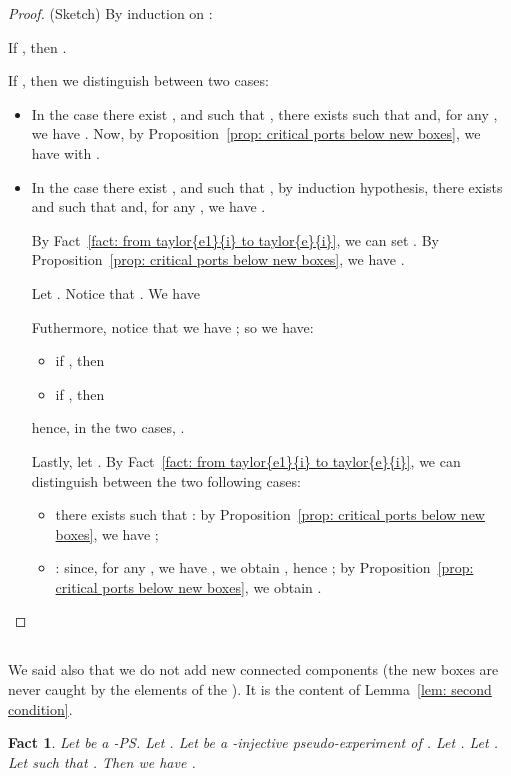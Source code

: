 \documentclass{article}
\theoremstyle{plain}
\newtheorem{fact}[theorem]{Fact}
\begin{document}
\begin{proof}
(Sketch) 
By induction on :

If , then .

If , then we distinguish between two cases:
\begin{itemize}
\item In the case there exist ,  and  such that , 
there exists  such that  and, for any , we have . 
Now, by Proposition~\ref{prop: critical ports below new boxes}, we have  with .
\item In the case there exist ,  and  such that , by induction hypothesis, there exists  and  such that  and, for any , we have . 

By Fact~\ref{fact: from taylor{e1}{i} to taylor{e}{i}}, we can set . By 
Proposition~\ref{prop: critical ports below new boxes}, we have .


Let . Notice that . We have 

Futhermore, notice that
we have ; so we have:
\begin{itemize}
\item if , then 

\item if , then

\end{itemize}
hence, in the two cases, .

Lastly, let . By Fact~\ref{fact: from taylor{e1}{i} to taylor{e}{i}}, we can distinguish between the two following cases:
\begin{itemize}
\item there exists  such that : by Proposition~\ref{prop: critical ports below new boxes}, we have ;
\item : since, for any , we have , we obtain , hence ; by Proposition~\ref{prop: critical ports below new boxes}, we obtain .
\end{itemize}
\end{itemize}
\end{proof}

\subsection{}\label{subsection: cond_sup_2}

We said also that we do not add new connected components (the new boxes are never caught by the elements of the ). It is the content of Lemma~\ref{lem: second condition}.

\begin{fact}\label{fact: coh[i]}
Let  be a -PS. Let . 
Let  be a -injective pseudo-experiment of . Let . 
Let . 
Let  such that .
 Then we have .
\end{fact}
\end{document}
